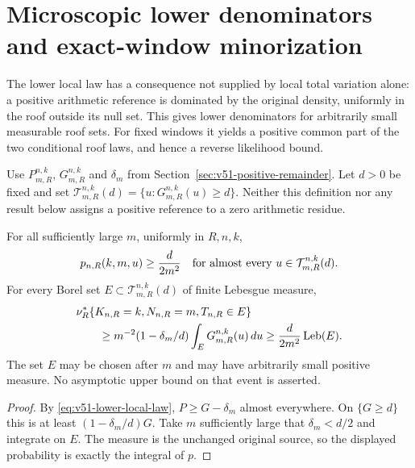 \section{Microscopic lower denominators and exact-window minorization}
\label{sec:v51-roof-minorization}
The lower local law has a consequence not supplied by local total
variation alone: a positive arithmetic reference is dominated by the
original density, uniformly in the roof outside its null set. This
gives lower denominators for arbitrarily small measurable roof sets.
For fixed windows it yields a positive common part of the two
conditional roof laws, and hence a reverse likelihood bound.

Use $P_{m,R}^{n,k}$, $G_{m,R}^{n,k}$ and $\delta_m$ from
Section~\ref{sec:v51-positive-remainder}. Let $d>0$ be fixed and set
$\mathcal T_{m,R}^{n,k}(d)=\{u:G_{m,R}^{n,k}(u)\ge d\}$.
Neither this definition nor any result below assigns a positive
reference to a zero arithmetic residue.

\begin{corollary}
\label{cor:v51-lower-denominators}
For all sufficiently large $m$, uniformly in $R,n,k$,
\begin{equation}\label{eq:v51-roof-lower-denominator}
 p_{n,R}(k,m,u)\ge \frac{d}{2m^2}
       \quad\hbox{for almost every }u\in\mathcal T_{m,R}^{n,k}(d).
\end{equation}
For every Borel set $E\subset\mathcal T_{m,R}^{n,k}(d)$ of finite
Lebesgue measure,
\begin{align}
 &\nu_R^*\{K_{n,R}=k,N_{n,R}=m,T_{n,R}\in E\}\notag\\
 &\qquad\ge m^{-2}(1-\delta_m/d)
                  \int_E G_{m,R}^{n,k}(u)\,du
       \ge \frac{d}{2m^2}\operatorname{Leb}(E).
                                    \label{eq:v51-measurable-denominator}
\end{align}
The set $E$ may be chosen after $m$ and may have arbitrarily small
positive measure. No asymptotic upper bound on that event is asserted.
\end{corollary}
\begin{proof}
By \eqref{eq:v51-lower-local-law}, $P\ge G-\delta_m$ almost
everywhere. On $\{G\ge d\}$ this is at least
$(1-\delta_m/d)G$. Take $m$ sufficiently large that $\delta_m<d/2$
and integrate on $E$. The measure is the unchanged original source,
so the displayed probability is exactly the integral of $p$.
\end{proof}

